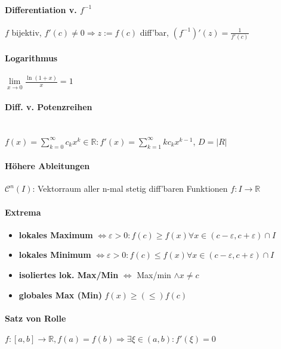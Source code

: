 \documentclass[paper=a3,paper=landscape, fontsize=9pt, DIV=30]{scrartcl}
\newcommand{\real}{{\mathbb{R}}}
\begin{document}
\begin{multicols*}{4}
  \paragraph{Differentiation v. $f^{-1}$}
  $f$ bijektiv, $f'(c) \neq 0 \Rightarrow z := f(c)$ diff'bar, $(f^{-1})'(z)=\frac{1}{f'(c)}$


  \paragraph{Logarithmus}
  $\lim\limits_{x\rightarrow0} \frac{\ln(1+x)}{x}=1$


  \paragraph{Diff. v. Potenzreihen}\hspace{0pt}\\
  $ f(x)=\sum_{k=0}^{\infty}c_kx^k \in \real: f'(x)=\sum_{k=1}^{\infty}kc_kx^{k-1}$, $D = \lvert R \rvert$


  \paragraph{Höhere Ableitungen}
  $\mathscr{C}^n(I)$: Vektorraum aller n-mal stetig diff'baren Funktionen $f: I \rightarrow \real$


  \paragraph{Extrema}
  \begin{itemize}
  \item \textbf{lokales Maximum} $\Leftrightarrow \varepsilon > 0: f(c) \geq f(x) \forall x \in (c-\varepsilon,c+\varepsilon)\cap I$
  \item \textbf{lokales Minimum} $\Leftrightarrow \varepsilon > 0: f(c) \leq f(x) \forall x \in (c-\varepsilon,c+\varepsilon)\cap I$
  \item \textbf{isoliertes lok. Max/Min} $\Leftrightarrow$ Max/min $\wedge x \neq c$
  \item \textbf{globales Max (Min)} $f(x) \geq (\leq) f(c)$
  \end{itemize}


  \paragraph{Satz von Rolle}
  $f: [a,b] \rightarrow \real, f(a)=f(b) \Rightarrow \exists \xi \in (a,b): f'(\xi)=0$



\end{multicols*}
\end{document}
